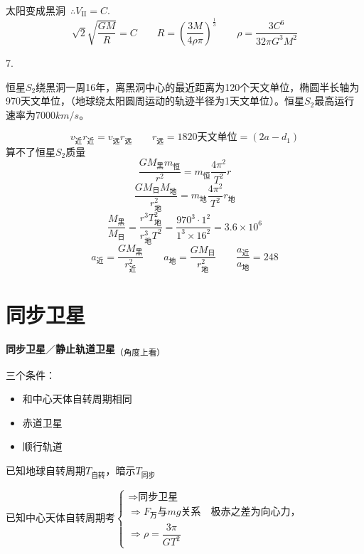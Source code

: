 太阳变成黑洞\ $\therefore V_{\mathrm{II}}=C$.
\[
\sqrt2\sqrt{\frac{GM}{R}}=C\qquad R=\left(\frac{3M}{4\rho\pi}\right)^{\frac13}\qquad\rho=\frac{3C^6}{32\pi G^3M^2}
\] %

7.
\begin{problem}
恒星$S_2$绕黑洞一周16年，离黑洞中心的最近距离为120个天文单位，椭圆半长轴为970天文单位，（地球绕太阳圆周运动的轨迹半径为1天文单位）。恒星$S_2$最高运行速率为$7000\unit{km/s}$。 %
\begin{solution}
\[
v_{\text{近}}r_{\text{近}}=v_{\text{远}}r_{\text{远}}\qquad r_{\text{远}}=1820\text{天文单位}=(2a-d_1) %
\]
算不了恒星$S_2$质量
\[
\frac{GM_{\text{黑}}m_{\text{恒}}}{r^2}=m_{\text{恒}}\frac{4\pi^2}{T^2}r
\]
\[
\frac{GM_{\text{日}}M_{\text{地}}}{r_{\text{地}}^2}=m_{\text{地}}\frac{4\pi^2}{T^2}r_{\text{地}}
\]
\[
\frac{M_{\text{黑}}}{M_{\text{日}}}=\frac{r^3T_{\text{地}}^2}{r_{\text{地}}^3T^2}=\frac{970^3\cdot1^2}{1^3\times16^2}=3.6\times10^6
\]
\[
a_{\text{近}}=\frac{GM_{\text{黑}}}{r_{\text{近}}^2}\qquad a_{\text{地}}=\frac{GM_{\text{日}}}{r_{\text{地}}^2}\qquad \frac{a_{\text{近}}}{a_{\text{地}}}=248
\]
\end{solution}
\end{problem}


\section{同步卫星}
\textbf{同步卫星}／\textbf{静止轨道卫星}\textsubscript{（角度上看）}

三个条件：
\begin{itemize}
\item 和中心天体自转周期相同
\item 赤道卫星
\item 顺行轨道
\end{itemize}

已知地球自转周期$T_{\text{自转}}$，暗示$T_{\text{同步}}$%

已知中心天体自转周期\quad 考$\left\{\begin{array}{l}
\Rightarrow\text{同步卫星}\\
\Rightarrow F_{\text{万}}\text{与}mg\text{关系}\quad\text{极赤之差为向心力，}\\
\Rightarrow\rho=\dfrac{3\pi}{GT^{2}}
\end{array}\right.$

